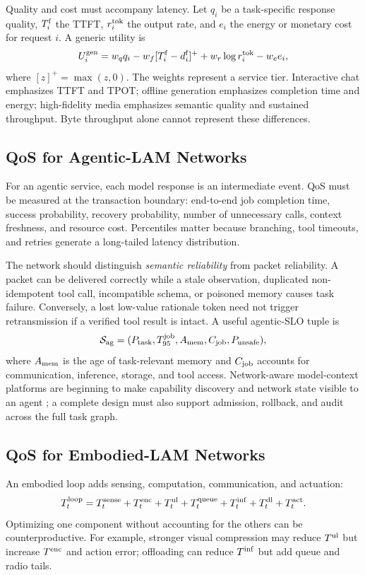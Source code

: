 \documentclass[letterpaper,journal]{IEEEtran}
\begin{document}
Quality and cost must accompany latency. Let $q_i$ be a task-specific response
quality, $T_i^{\rm f}$ the TTFT, $r_i^{\rm tok}$ the output rate, and $e_i$ the
energy or monetary cost for request $i$. A generic utility is
\begin{equation}
U_i^{\rm gen}=w_q q_i-w_f[T_i^{\rm f}-d_i^{\rm f}]^+
+w_r\log r_i^{\rm tok}-w_e e_i,
\label{eq:gen_utility}
\end{equation}
where $[z]^+=\max(z,0)$. The weights represent a service tier. Interactive
chat emphasizes TTFT and TPOT; offline generation emphasizes completion time
and energy; high-fidelity media emphasizes semantic quality and sustained
throughput. Byte throughput alone cannot represent these differences.

\subsection{QoS for Agentic-LAM Networks}
For an agentic service, each model response is an intermediate event. QoS must
be measured at the transaction boundary: end-to-end job completion time,
success probability, recovery probability, number of unnecessary calls,
context freshness, and resource cost. Percentiles matter because branching,
tool timeouts, and retries generate a long-tailed latency distribution.

The network should distinguish \emph{semantic reliability} from packet
reliability. A packet can be delivered correctly while a stale observation,
duplicated non-idempotent tool call, incompatible schema, or poisoned memory
causes task failure. Conversely, a lost low-value rationale token need not
trigger retransmission if a verified tool result is intact. A useful
agentic-SLO tuple is
\[
{\cal S}_{\rm ag}=(P_{\rm task},T_{95}^{\rm job},A_{\rm mem},
C_{\rm job},P_{\rm unsafe}),
\]
where $A_{\rm mem}$ is the age of task-relevant memory and $C_{\rm job}$
accounts for communication, inference, storage, and tool access. Network-aware
model-context platforms are beginning to make capability discovery and
network state visible to an agent \cite{netmcp}; a complete design must also
support admission, rollback, and audit across the full task graph.

\subsection{QoS for Embodied-LAM Networks}
An embodied loop adds sensing, computation, communication, and actuation:
\begin{equation}
T_t^{\rm loop}=T_t^{\rm sense}+T_t^{\rm enc}+T_t^{\rm ul}
+T_t^{\rm queue}+T_t^{\rm inf}+T_t^{\rm dl}+T_t^{\rm act}.
\label{eq:loop_delay}
\end{equation}
Optimizing one component without accounting for the others can be
counterproductive. For example, stronger visual compression may reduce
$T^{\rm ul}$ but increase $T^{\rm enc}$ and action error; offloading can
reduce $T^{\rm inf}$ but add queue and radio tails.
\end{document}
